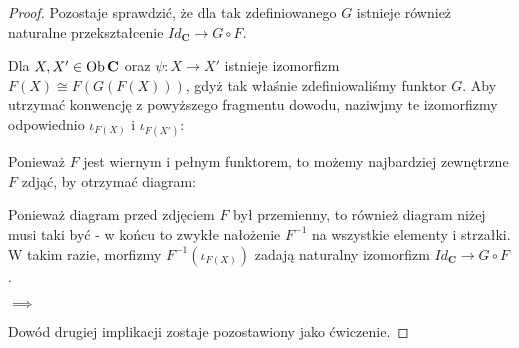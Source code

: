 \begin{proof}
  Pozostaje sprawdzić, że dla tak zdefiniowanego $G$ istnieje również naturalne przekształcenie $Id_{\mathbf{C}}\to G\circ F$.

  Dla $X, X'\in\operatorname{Ob}\mathbf{C}$ oraz $\psi:X\to X'$ istnieje izomorfizm $F(X)\cong F(G(F(X)))$, gdyż tak właśnie zdefiniowaliśmy funktor $G$. Aby utrzymać konwencję z powyższego fragmentu dowodu, naziwjmy te izomorfizmy odpowiednio $\iota_{F(X)}$ i $\iota_{F(X')}$:
  \begin{center}\end{center}
  Ponieważ $F$ jest wiernym i pełnym funktorem, to możemy najbardziej zewnętrzne $F$ zdjąć, by otrzymać diagram:
  \begin{center}\end{center}
  Ponieważ diagram przed zdjęciem $F$ był przemienny, to również diagram niżej musi taki być - w końcu to zwykłe nałożenie $F^{-1}$ na wszystkie elementy i strzałki. W takim razie, morfizmy $F^{-1}(\iota_{F(X)})$ zadają naturalny izomorfizm $Id_{\mathbf{C}}\to G\circ F$.

  $\implies$

  Dowód drugiej implikacji zostaje pozostawiony jako ćwiczenie.
\end{proof}

